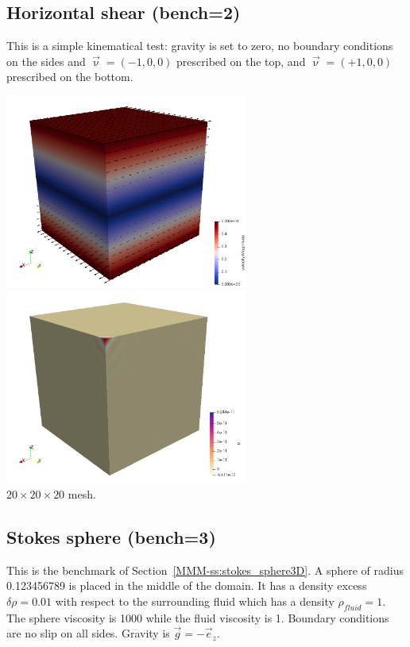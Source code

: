 \subsection*{Horizontal shear (bench=2)}

This is a simple kinematical test: gravity is set to zero, no boundary 
conditions on the sides and $\vec\upnu=(-1,0,0)$ prescribed on the top, and 
$\vec\upnu=(+1,0,0)$ prescribed on the bottom.

\begin{center}
\includegraphics[width=8cm]{python_codes/fieldstone_82/results/bench2/vel}
\includegraphics[width=8cm]{python_codes/fieldstone_82/results/bench2/press}\\
{\captionfont $20\times 20 \times 20$ mesh.} 
\end{center}

\subsection*{Stokes sphere (bench=3)}

This is the benchmark of Section~\ref{MMM-ss:stokes_sphere3D}.
A sphere of radius 0.123456789 is placed in the middle of the domain. 
It has a density excess $\delta\rho=0.01$
with respect to the surrounding fluid which has a density $\rho_{fluid}=1$. 
The sphere viscosity is 1000 while the fluid viscosity is 1.
Boundary conditions are no slip on all sides. Gravity is $\vec{g}=-\vec{e}_z$.

